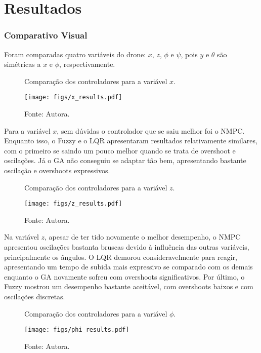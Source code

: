 \section{Resultados}

\subsubsection{Comparativo Visual}
Foram comparadas quatro variáveis do drone: $x$, $z$, $\phi$ e $\psi$, 
pois $y$ e $\theta$ são simétricas a $x$ e $\phi$, respectivamente.
\begin{figure}[h!]
    \centering
    \caption{Comparação dos controladores para a variável $x$.} \vspace{-0.3cm}
    \texttt{[image: figs/x\_results.pdf]}
    \vspace{-0.5cm} \caption*{\footnotesize{Fonte: Autora.}} \vspace{-1cm}
    \label{fig:x_results}
\end{figure}

Para a variável $x$, sem dúvidas o controlador que se saiu melhor foi o NMPC. Enquanto isso, o Fuzzy 
e o LQR apresentaram resultados relativamente similares, com o primeiro se saindo um pouco melhor 
quando se trata de overshoot e oscilações. Já o GA não conseguiu se adaptar tão bem, apresentando 
bastante oscilação e overshoots expressivos.
\begin{figure}[h!]
    \centering
    \caption{Comparação dos controladores para a variável $z$.} \vspace{-0.3cm}
    \texttt{[image: figs/z\_results.pdf]}
    \vspace{-0.5cm} \caption*{\footnotesize{Fonte: Autora.}} \vspace{-1cm}
    \label{fig:z_results}
\end{figure}
\pagebreak

Na variável $z$, apesar de ter tido novamente o melhor desempenho, o NMPC apresentou oscilações 
bastanta bruscas devido à influência das outras variáveis, principalmente os ângulos. O LQR demorou 
consideravelmente para reagir, apresentando um tempo de subida mais expressivo se comparado com os demais 
enquanto o GA novamente sofreu com overshoots significativos. Por último, o Fuzzy mostrou um desempenho 
bastante aceitável, com overshoots baixos e com oscilações discretas.
\begin{figure}[h!]
    \centering
    \caption{Comparação dos controladores para a variável $\phi$.} \vspace{-0.3cm}
    \texttt{[image: figs/phi\_results.pdf]}
    \vspace{-0.5cm} \caption*{\footnotesize{Fonte: Autora.}} \vspace{-1cm}
    \label{fig:phi_results}
\end{figure}
\pagebreak

